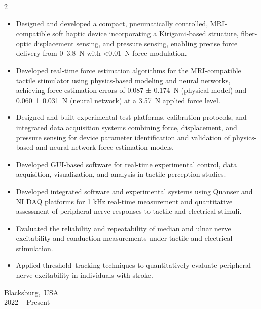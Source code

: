 \documentclass[10pt, letterpaper]{article}
\newenvironment{highlights}{
    \begin{itemize}[
        topsep=0.10 cm,
        parsep=0.10 cm,
        partopsep=0pt,
        itemsep=0pt,
        leftmargin=0.2 cm + 10pt
    ]
}{
    \end{itemize}
} %
\newenvironment{twocolentry}[2][]{
    \onecolentry
    \def\secondColumn{#2}
    \setcolumnwidth{\fill, 2.8 cm}
    \begin{paracol}{2}
}{
    \switchcolumn \raggedleft \secondColumn
    \end{paracol}
    \endonecolentry
} %
\begin{document}
\begin{twocolentry}{
            Blacksburg,~USA\\
        2022 – Present
        }
\begin{highlights}
                \item Designed and developed a compact, pneumatically controlled, MRI-compatible soft haptic device incorporating a Kirigami-based structure, fiber-optic displacement sensing, and pressure sensing, enabling precise force delivery from 0–3.8~N with <0.01~N force modulation.
                \item Developed real-time force estimation algorithms for the MRI-compatible tactile stimulator using physics-based modeling and neural networks, achieving force estimation errors of 0.087 ± 0.174~N (physical model) and 0.060 ± 0.031~N (neural network) at a 3.57~N applied force level.
                 \item Designed and built experimental test platforms, calibration protocols, and integrated data acquisition systems combining force, displacement, and pressure sensing for device parameter identification and validation of physics-based and neural-network force estimation models.
                \item Developed GUI-based software for real-time experimental control, data acquisition, visualization, and analysis in tactile perception studies.
                \item Developed integrated software and experimental systems using Quanser and NI DAQ platforms for 1 kHz real-time measurement and quantitative assessment of peripheral nerve responses to tactile and electrical stimuli.
                \item Evaluated the reliability and repeatability of median and ulnar nerve excitability and conduction measurements under tactile and electrical stimulation.
                \item Applied threshold--tracking techniques to quantitatively evaluate peripheral nerve excitability in individuals with stroke.

\end{highlights}
\end{twocolentry}
\end{document}
